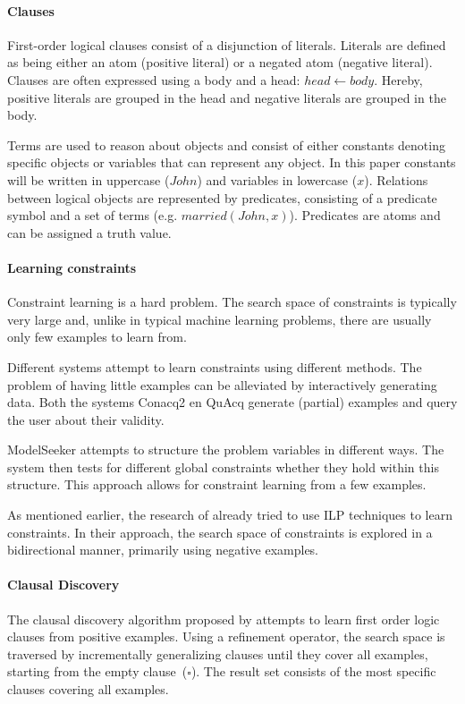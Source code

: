 \documentclass[letterpaper]{article}
\theoremstyle{definition}
\begin{document}
\paragraph{Clauses}
First-order logical clauses consist of a disjunction of literals.
Literals are defined as being either an atom (positive literal) or a negated atom (negative literal).
Clauses are often expressed using a body and a head: $\mathit{head} \leftarrow \mathit{body}$.
Hereby, positive literals are grouped in the head and negative literals are grouped in the body.

Terms are used to reason about objects and consist of either constants denoting specific objects or variables that can represent any object.
In this paper constants will be written in uppercase ($\mathit{John}$) and variables in lowercase ($\mathit{x}$).
Relations between logical objects are represented by predicates, consisting of a predicate symbol and a set of terms (e.g. $\mathit{married(John, x)}$).
Predicates are atoms and can be assigned a truth value.

\paragraph{Learning constraints}
Constraint learning is a hard problem.
The search space of constraints is typically very large and, unlike in typical machine learning problems, there are usually only few examples to learn from.

Different systems attempt to learn constraints using different methods.
The problem of having little examples can be alleviated by interactively generating data.
Both the systems Conacq2 \cite{bessiere2007query} en QuAcq \cite{bessiere2013constraint} generate (partial) examples and query the user about their validity.

ModelSeeker \cite{Beldiceanu:ModelSeeker} attempts to structure the problem variables in different ways.
The system then tests for different global constraints whether they hold within this structure.
This approach allows for constraint learning from a few examples.

As mentioned earlier, the research of \cite{Lallouet:LearningCP} already tried to use ILP techniques to learn constraints.
In their approach, the search space of constraints is explored in a bidirectional manner, primarily using negative examples.

\paragraph{Clausal Discovery}
The clausal discovery algorithm proposed by \cite{DeRaedt:ClausalDiscovery} attempts to learn first order logic clauses from positive examples.
Using a refinement operator, the search space is traversed by incrementally generalizing clauses until they cover all examples, starting from the empty clause~($\square$).
The result set consists of the most specific clauses covering all examples.
\end{document}
